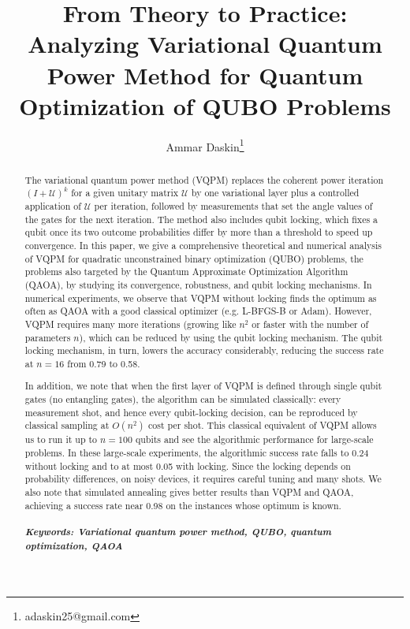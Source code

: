 \documentclass[onecolumn,10pt]{article}
\theoremstyle{remark}
\theoremstyle{plain}
\providecommand{\orcidlink}[1]{}%
\begin{document}
\title{From Theory to Practice: Analyzing Variational Quantum Power Method for Quantum Optimization of QUBO Problems}
\author{Ammar Daskin\orcidlink{0000-0002-1497-5031}\thanks{adaskin25@gmail.com}}


\date{}

\maketitle
\begin{abstract}
The variational quantum power method (VQPM) replaces the coherent power iteration $(I+\mathcal{U})^k$ for a given unitary matrix $\mathcal{U}$ by one variational layer plus a controlled application of $\mathcal{U}$ per iteration, followed by measurements that set the angle values of the gates for the next iteration. The method also includes qubit locking, which fixes a qubit once its two outcome probabilities differ by more than a threshold to speed up convergence. In this paper, we give a comprehensive theoretical and numerical analysis of VQPM for quadratic unconstrained binary optimization (QUBO) problems, the problems also targeted by the Quantum Approximate Optimization Algorithm (QAOA), by studying its convergence, robustness, and qubit locking mechanisms.
In numerical experiments, we observe that VQPM without locking finds the optimum as often as QAOA with a good classical optimizer (e.g. L-BFGS-B or Adam). However, VQPM requires many more iterations (growing like $n^2$ or faster with the number of parameters $n$), which can be reduced by using the qubit locking mechanism. The qubit locking mechanism, in turn, lowers the accuracy considerably, reducing the success rate at $n=16$ from 0.79 to 0.58.

In addition, we note that when the first layer of VQPM is defined through single qubit gates (no entangling gates), the algorithm can be simulated classically: every measurement shot, and hence every qubit-locking decision, can be reproduced by classical sampling at $O(n^2)$ cost per shot. This classical equivalent of VQPM allows us to run it up to $n=100$ qubits and see the algorithmic performance for large-scale problems. In these large-scale experiments, the algorithmic success rate falls to 0.24 without locking and to at most 0.05 with locking. Since the locking depends on probability differences, on noisy devices, it requires careful tuning and many shots. We also note that simulated annealing gives better results than VQPM and QAOA, achieving a success rate near 0.98 on the instances whose optimum is known.  
\\
\\
\textbf{\textit{Keywords: Variational quantum power method, QUBO, quantum optimization, QAOA}}
\end{abstract}
\end{document}
